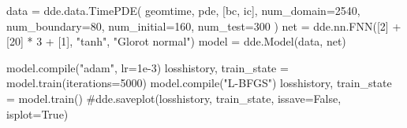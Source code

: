 \documentclass[
  spanish,
  us-letterpaper,
  DIV=11,
  numbers=noendperiod]{scrreprt}
\newenvironment{Shaded}{\begin{snugshade}}{\end{snugshade}}
\newcommand{\BuiltInTok}[1]{\textcolor[rgb]{0.00,0.23,0.31}{#1}}
\newcommand{\CommentTok}[1]{\textcolor[rgb]{0.37,0.37,0.37}{#1}}
\newcommand{\DecValTok}[1]{\textcolor[rgb]{0.68,0.00,0.00}{#1}}
\newcommand{\FloatTok}[1]{\textcolor[rgb]{0.68,0.00,0.00}{#1}}
\newcommand{\NormalTok}[1]{\textcolor[rgb]{0.00,0.23,0.31}{#1}}
\newcommand{\OperatorTok}[1]{\textcolor[rgb]{0.37,0.37,0.37}{#1}}
\newcommand{\StringTok}[1]{\textcolor[rgb]{0.13,0.47,0.30}{#1}}
\theoremstyle{plain}
\theoremstyle{definition}
\theoremstyle{remark}
\begin{document}
\begin{Shaded}
\begin{Highlighting}[]
\NormalTok{data }\OperatorTok{=}\NormalTok{ dde.data.TimePDE(}
\NormalTok{    geomtime, pde, [bc, ic],}
\NormalTok{    num\_domain}\OperatorTok{=}\DecValTok{2540}\NormalTok{,}
\NormalTok{    num\_boundary}\OperatorTok{=}\DecValTok{80}\NormalTok{,}
\NormalTok{    num\_initial}\OperatorTok{=}\DecValTok{160}\NormalTok{,}
\NormalTok{    num\_test}\OperatorTok{=}\DecValTok{300}
\NormalTok{)}
\NormalTok{net }\OperatorTok{=}\NormalTok{ dde.nn.FNN([}\DecValTok{2}\NormalTok{] }\OperatorTok{+}\NormalTok{ [}\DecValTok{20}\NormalTok{] }\OperatorTok{*} \DecValTok{3} \OperatorTok{+}\NormalTok{ [}\DecValTok{1}\NormalTok{], }\StringTok{"tanh"}\NormalTok{, }\StringTok{"Glorot normal"}\NormalTok{)}
\NormalTok{model }\OperatorTok{=}\NormalTok{ dde.Model(data, net)}

\NormalTok{model.}\BuiltInTok{compile}\NormalTok{(}\StringTok{"adam"}\NormalTok{, lr}\OperatorTok{=}\FloatTok{1e{-}3}\NormalTok{)}
\NormalTok{losshistory, train\_state }\OperatorTok{=}\NormalTok{ model.train(iterations}\OperatorTok{=}\DecValTok{5000}\NormalTok{)}
\NormalTok{model.}\BuiltInTok{compile}\NormalTok{(}\StringTok{"L{-}BFGS"}\NormalTok{)}
\NormalTok{losshistory, train\_state }\OperatorTok{=}\NormalTok{ model.train()}
\CommentTok{\#dde.saveplot(losshistory, train\_state, issave=False, isplot=True)}
\end{Highlighting}
\end{Shaded}
\end{document}
